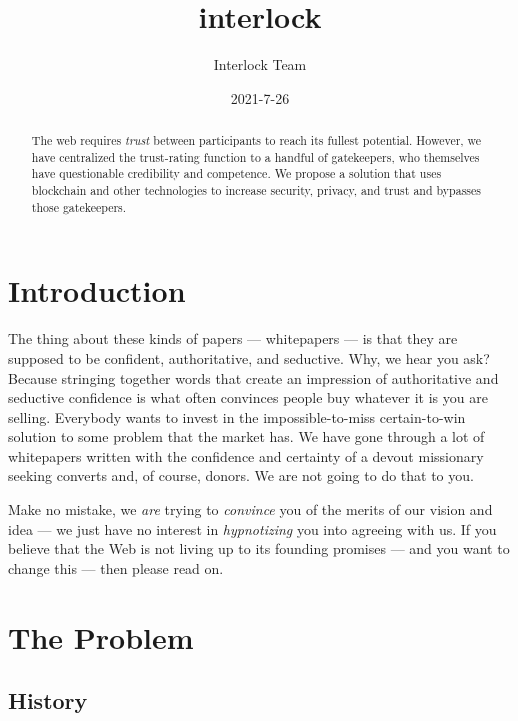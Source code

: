 \documentclass[a4paper]{article}
\title{interlock}
\author{Interlock Team}
\date{2021-7-26}
\begin{document}
\maketitle
\tableofcontents
\begin{abstract}
The web requires \emph{trust} between participants to reach its fullest potential. However, we have centralized the trust-rating function to a handful of gatekeepers, who themselves have questionable credibility and competence. We propose a solution that uses blockchain and other technologies to increase security, privacy, and trust and bypasses those gatekeepers.\end{abstract}
\section{Introduction}
\label{Introduction}

The thing about these kinds of papers ---  whitepapers ---  is that they are supposed to be confident, authoritative, and seductive. Why, we hear you ask? Because stringing together words that create an impression of authoritative and seductive confidence is what often convinces people buy whatever it is you are selling. Everybody wants to invest in the impossible-to-miss certain-to-win solution to some problem that the market has. We have gone through a lot of whitepapers written with the confidence and certainty of a devout missionary seeking converts and, of course, donors. We are not going to do that to you.

Make no mistake, we \emph{are} trying to \emph{convince} you of the merits of our vision and idea ---  we just have no interest in \emph{hypnotizing} you into agreeing with us. If you believe that the Web is not living up to its founding promises ---  and you want to change this ---  then please read on.
\section{The Problem}
\label{The Problem}
\subsection{History}
\label{History}
\end{document}
